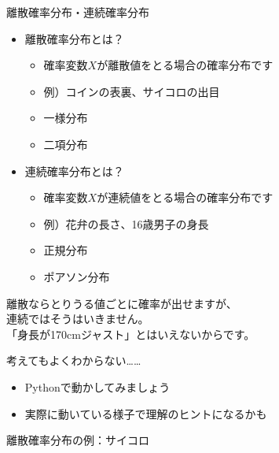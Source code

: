 \documentclass[dvipdfmx,cjk]{beamer}
\begin{document}
\begin{frame}{離散確率分布・連続確率分布}

\begin{itemize}

    \item 離散確率分布とは？
        \begin{itemize}
        \item 確率変数$X$が離散値をとる場合の確率分布です
        \item 例）コインの表裏、サイコロの出目
        \item 一様分布
        \item 二項分布
        \end{itemize}

    \item 連続確率分布とは？
        \begin{itemize}
        \item 確率変数$X$が連続値をとる場合の確率分布です
        \item 例）花弁の長さ、16歳男子の身長
        \item 正規分布
        \item ポアソン分布
        \end{itemize}

\end{itemize}

\vskip 1cm

離散ならとりうる値ごとに確率が出せますが、\\
連続ではそうはいきません。\\
「身長が170cmジャスト」とはいえないからです。

\end{frame}


\begin{frame}{考えてもよくわからない……}

\begin{itemize}
    \item Pythonで動かしてみましょう
    \item 実際に動いている様子で理解のヒントになるかも
\end{itemize}

\end{frame}


\begin{frame}{離散確率分布の例：サイコロ}


\end{frame}
\end{document}
